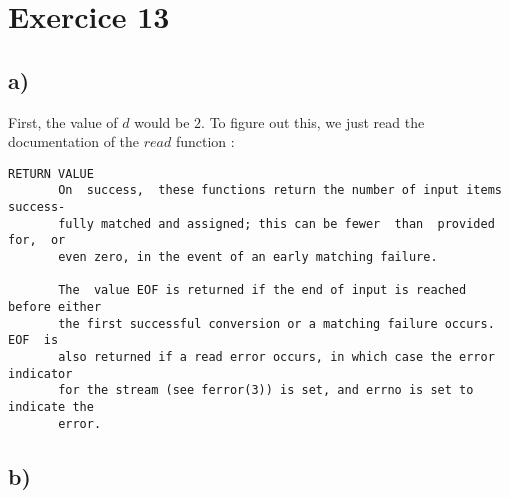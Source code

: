 \documentclass[a4paper,11pt]{report}
\begin{document}
\section*{Exercice 13}

\subsection*{a)}

First, the value of $d$ would be $2$. To figure out this, we just read the
documentation of the $read$ function :

\begin{verbatim}
RETURN VALUE
       On  success,  these functions return the number of input items success‐
       fully matched and assigned; this can be fewer  than  provided  for,  or
       even zero, in the event of an early matching failure.

       The  value EOF is returned if the end of input is reached before either
       the first successful conversion or a matching failure occurs.   EOF  is
       also returned if a read error occurs, in which case the error indicator
       for the stream (see ferror(3)) is set, and errno is set to indicate the
       error.
\end{verbatim}



\subsection*{b)}

    
\end{document}
